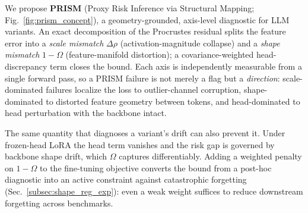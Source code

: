 \documentclass{article}
\begin{document}
We propose \textbf{PRISM} (Proxy Risk Inference via Structural Mapping; Fig.~\ref{fig:prism_concept}), a geometry-grounded, axis-level diagnostic for LLM variants.
An exact decomposition of the Procrustes residual splits the feature error into a \emph{scale mismatch} $\Delta\rho$ (activation-magnitude collapse) and a \emph{shape mismatch} $1-\Omega$ (feature-manifold distortion); a covariance-weighted head-discrepancy term closes the bound.
Each axis is independently measurable from a single forward pass, so a PRISM failure is not merely a flag but a \emph{direction}: scale-dominated failures localize the loss to outlier-channel corruption, shape-dominated to distorted feature geometry between tokens, and head-dominated to head perturbation with the backbone intact.

The same quantity that diagnoses a variant's drift can also prevent it.
Under frozen-head LoRA the head term vanishes and the risk gap is governed by backbone shape drift, which $\Omega$ captures differentiably.
Adding a weighted penalty on $1-\Omega$ to the fine-tuning objective converts the bound from a post-hoc diagnostic into an active constraint against catastrophic forgetting (Sec.~\ref{subsec:shape_reg_exp}): even a weak weight suffices to reduce downstream forgetting across benchmarks.
\end{document}
